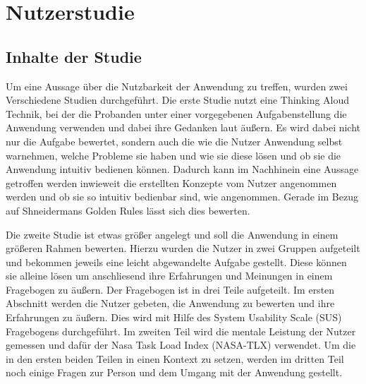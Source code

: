 
\chapter{Nutzerstudie}
\label{cha:Usability_study}

\section{Inhalte der Studie}
\label{sec:study_content}
Um eine Aussage über die Nutzbarkeit der Anwendung zu treffen, wurden zwei Verschiedene Studien durchgeführt.
Die erste Studie nutzt eine Thinking Aloud Technik, bei der die Probanden unter einer vorgegebenen Aufgabenstellung die Anwendung verwenden und dabei ihre Gedanken laut äußern.
Es wird dabei nicht nur die Aufgabe bewertet, sondern auch die wie die Nutzer Anwendung selbst warnehmen, welche Probleme sie haben und wie sie diese lösen und ob sie die Anwendung intuitiv bedienen können.
Dadurch kann im Nachhinein eine Aussage getroffen werden inwieweit die erstellten Konzepte vom Nutzer angenommen werden und ob sie so intuitiv bedienbar sind, wie angenommen.
Gerade im Bezug auf Shneidermans Golden Rules \cite{10.5555/3033040} lässt sich dies bewerten.

Die zweite Studie ist etwas größer angelegt und soll die Anwendung in einem größeren Rahmen bewerten. Hierzu wurden die Nutzer in zwei Gruppen aufgeteilt und bekommen jeweils eine leicht abgewandelte Aufgabe gestellt.
Diese können sie alleine lösen um anschliesend ihre Erfahrungen und Meinungen in einem Fragebogen zu äußern.
Der Fragebogen ist in drei Teile aufgeteilt. Im ersten Abschnitt werden die Nutzer gebeten, die Anwendung zu bewerten und ihre Erfahrungen zu äußern. Dies wird mit Hilfe des System Usability Scale (SUS) Fragebogens \cite{brooke1996sus} durchgeführt. 
Im zweiten Teil wird die mentale Leistung der Nutzer gemessen und dafür der Nasa Task Load Index (NASA-TLX) \cite{HART1988139} verwendet.
Um die in den ersten beiden Teilen in einen Kontext zu setzen, werden im dritten Teil noch einige Fragen zur Person und dem Umgang mit der Anwendung gestellt.

